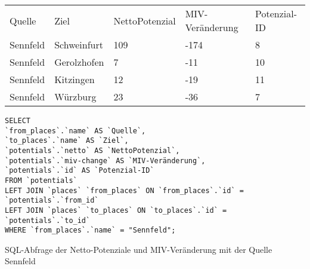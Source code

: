 \begin{tabularx}{\textwidth}{*5{X}}
    Quelle & Ziel & NettoPotenzial & MIV-Veränderung & Potenzial-ID\\ 
    Sennfeld & Schweinfurt & 109 & -174 & 8\\ 
    Sennfeld & Gerolzhofen & 7 & -11 & 10\\ 
    Sennfeld & Kitzingen & 12 & -19 & 11\\ 
    Sennfeld & Würzburg & 23 & -36 & 7\\ 
    \end{tabularx}    
\newline
\newline
\begin{listing}[htbp]
\begin{verbatim}
SELECT
`from_places`.`name` AS `Quelle`, 
`to_places`.`name` AS `Ziel`, 
`potentials`.`netto` AS `NettoPotenzial`, 
`potentials`.`miv-change` AS `MIV-Veränderung`, 
`potentials`.`id` AS `Potenzial-ID`
FROM `potentials`
LEFT JOIN `places` `from_places` ON `from_places`.`id` = `potentials`.`from_id`
LEFT JOIN `places` `to_places` ON `to_places`.`id` = `potentials`.`to_id`
WHERE `from_places`.`name` = "Sennfeld";
\end{verbatim}
\caption{SQL-Abfrage der Netto-Potenziale und MIV-Veränderung mit der Quelle Sennfeld}\label{lst-fz-sennfeld}
\end{listing}